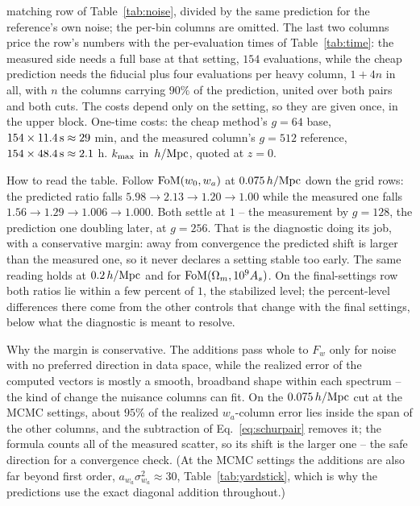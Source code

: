 \documentclass[11pt]{article}
\newcommand{\kmax}{k_{\rm max}}
\newcommand{\hMpc}{\,h/{\rm Mpc}}
\begin{document}
\begin{table}[tbp]
{    matching row of Table~\ref{tab:noise}, divided by the same
    prediction for the reference's own noise; the per-bin columns
    are omitted.  The last two columns price the row's numbers with
    the per-evaluation times of Table~\ref{tab:time}: the measured
    side needs a full base at that setting, $154$ evaluations,
    while the cheap prediction needs the fiducial plus four
    evaluations per heavy column, $1 + 4n$ in all, with $n$ the
    columns carrying $90\%$ of the prediction, united over both
    pairs and both cuts.  The costs depend only on the setting, so
    they are given once, in the upper block.  One-time costs: the
    cheap method's $g = 64$ base, $154 \times 11.4\,{\rm s} \approx
    29$ min, and the measured column's $g = 512$ reference,
    $154 \times 48.4\,{\rm s} \approx 2.1$ h.  $\kmax$ in $\hMpc$,
    quoted at $z = 0$.}
  \label{tab:noisefom}
\end{table}

How to read the table.  Follow ${\rm FoM}(w_0, w_a)$ at
$0.075\hMpc$ down the grid rows: the predicted ratio falls
$5.98 \to 2.13 \to 1.20 \to 1.00$ while the measured one falls
$1.56 \to 1.29 \to 1.006 \to 1.000$.  Both settle at $1$ -- the
measurement by $g = 128$, the prediction one doubling later, at
$g = 256$.  That is the diagnostic doing its job, with a
conservative margin: away from convergence the predicted shift is
larger than the measured one, so it never declares a setting
stable too early.  The same reading holds at $0.2\hMpc$ and for
${\rm FoM}(\Omega_m, 10^9 A_s)$.  On the final-settings row both
ratios lie within a few percent of $1$, the stabilized level; the
percent-level differences there come from the other controls that
change with the final settings, below what the diagnostic is meant
to resolve.

Why the margin is conservative.  The additions pass whole to $F_w$
only for noise with no preferred direction in data space, while
the realized error of the computed vectors is mostly a smooth,
broadband shape within each spectrum -- the kind of change the
nuisance columns can fit.  On the $0.075\hMpc$ cut at the MCMC
settings, about $95\%$ of the realized $w_a$-column error lies
inside the span of the other columns, and the subtraction of
Eq.~\eqref{eq:schurpair} removes it; the formula counts all of the
measured scatter, so its shift is the larger one -- the safe
direction for a convergence check.  (At the MCMC settings the
additions are also far beyond first order,
$a_{w_a}\sigma_{w_a}^2 \approx 30$, Table~\ref{tab:yardstick},
which is why the predictions use the exact diagonal addition
throughout.)
\end{document}
